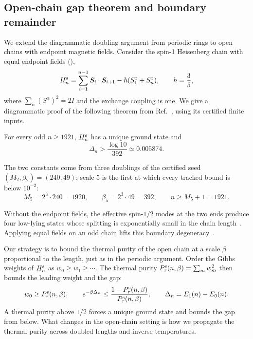 
\subsection{Open-chain gap theorem and boundary remainder}
\label{obc:setup}

We extend the diagrammatic doubling argument from periodic rings
to open chains with endpoint magnetic fields. Consider the spin-1
Heisenberg chain with equal endpoint fields (\fieldsame),
\begin{equation}
    H_n^{\mathrm{s}}
    =\sum_{i=1}^{n-1}\bm S_i\cdot\bm S_{i+1}
    -h(S_1^z+S_n^z),\qquad h=\frac35,
    \label{obc:model}
\end{equation}
where $\sum_\alpha(S^\alpha)^2=2I$ and the exchange coupling is one.
We give a diagrammatic proof of the following theorem from
Ref.~\cite{OpenAI2026Boundaryfield}, using its certified finite inputs.

\begin{theorem}
    \label{obc:theorem}
    For every odd $n\ge1921$, $H_n^{\mathrm{s}}$ has a unique ground state and
    \[
        \Delta_n>\frac{\log 10}{392}\simeq0.005874.
    \]
\end{theorem}
\noindent The two constants come from three doublings of the certified
seed $(M_2,\beta_2)=(240,49)$; scale $5$ is the first at which every
tracked bound is below $10^{-2}$:
\[
    M_5=2^3\cdot240=1920,\qquad \beta_5=2^3\cdot49=392,\qquad
    n\ge M_5+1=1921.
\]

Without the endpoint fields, the effective spin-$1/2$ modes at the
two ends produce four low-lying states whose splitting is exponentially
small in the chain length~\cite{Kennedy1990Exact}. Applying equal fields on an odd chain lifts this
boundary degeneracy~\cite{OpenAI2026Boundaryfield}.

Our strategy is to bound the thermal purity of the open chain at a
scale $\beta$ proportional to the length, just as in the periodic
argument. Order the Gibbs weights of $H_n^{\mathrm{s}}$ as $w_0\ge w_1\ge\cdots$.
The thermal purity $P_{\tau}^{\mathrm{s}}(n,\beta)=\sum_m w_m^2$ then bounds the
leading weight and the gap:
\begin{equation}
    w_0\ge P_{\tau}^{\mathrm{s}}(n,\beta),\qquad
    e^{-\beta\Delta_n}
    \le\frac{1-P_{\tau}^{\mathrm{s}}(n,\beta)}{P_{\tau}^{\mathrm{s}}(n,\beta)},\qquad
    \Delta_n=E_1(n)-E_0(n).
    \label{obc:target}
\end{equation}
A thermal purity above $1/2$ forces a unique ground state and bounds the
gap from below. What changes in the open-chain setting is how we
propagate the thermal purity across doubled lengths and inverse
temperatures.

